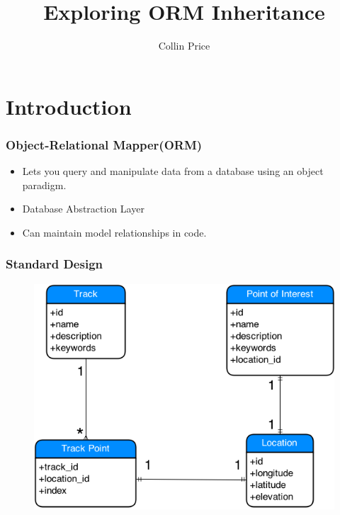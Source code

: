 \documentclass{beamer}
\title[ORM Inheritance]{Exploring ORM Inheritance}
\author{Collin Price}
\begin{document}
\begin{frame}
	\titlepage
\end{frame}

\section{Introduction}

\begin{frame}
	\frametitle{Object-Relational Mapper(ORM)}
	\begin{itemize}
		\item Lets you query and manipulate data from a database using an object paradigm.
		\item Database Abstraction Layer
		\item Can maintain model relationships in code.
	\end{itemize}
\end{frame}

\begin{frame}
	\frametitle{Standard Design}
	\begin{figure}
		\centering
		\includegraphics[scale=0.4]{resources/verbose-gps.png}
	\end{figure}
\end{frame}
\end{document}
